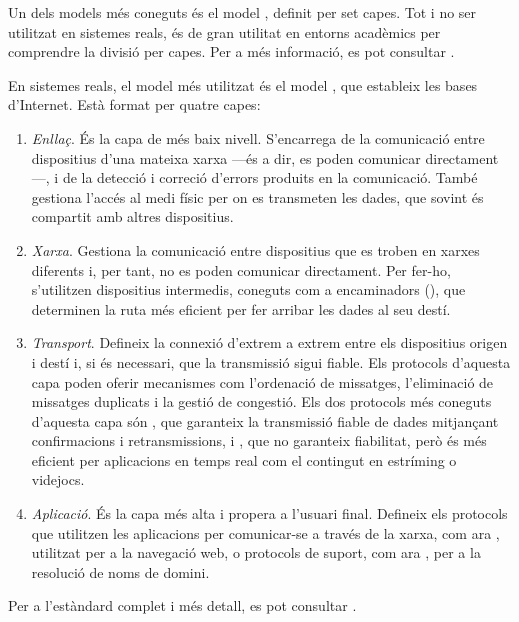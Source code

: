 \documentclass{tfgitic}[2024/07/01]
\begin{document}
Un dels models més coneguts és el model , definit per set capes. Tot i no ser utilitzat en sistemes reals, és de gran utilitat en entorns acadèmics per comprendre la divisió per capes. Per a més informació, es pot consultar \cite{noauthor_isoiec_1994}.

En sistemes reals, el model més utilitzat és el model , que estableix les bases d'Internet. Està format per quatre capes:
\begin{enumerate}
    \item \emph{Enllaç}. És la capa de més baix nivell. S'encarrega de la comunicació entre dispositius d'una mateixa xarxa ---és a dir, es poden comunicar directament---, i de la detecció i correció d'errors produits en la comunicació. També gestiona l'accés al medi físic per on es transmeten les dades, que sovint és compartit amb altres dispositius.
    \item \emph{Xarxa}. Gestiona la comunicació entre dispositius que es troben en xarxes diferents i, per tant, no es poden comunicar directament. Per fer-ho, s'utilitzen dispositius intermedis, coneguts com a encaminadors (), que determinen la ruta més eficient per fer arribar les dades al seu destí.
    \item \emph{Transport}. Defineix la connexió d'extrem a extrem entre els dispositius origen i destí i, si és necessari, que la transmissió sigui fiable. Els protocols d'aquesta capa poden oferir mecanismes com l'ordenació de missatges, l'eliminació de missatges duplicats i la gestió de congestió. Els dos protocols més coneguts d'aquesta capa són , que garanteix la transmissió fiable de dades mitjançant confirmacions i retransmissions, i , que no garanteix fiabilitat, però és més eficient per aplicacions en temps real com el contingut en estríming o videjocs.
    \item \emph{Aplicació}. És la capa més alta i propera a l'usuari final. Defineix els protocols que utilitzen les aplicacions per comunicar-se a través de la xarxa, com ara , utilitzat per a la navegació web, o protocols de suport, com ara , per a la resolució de noms de domini.
\end{enumerate}
Per a l'estàndard complet i més detall, es pot consultar \cite{braden_requirements_1989}. 

\end{document}
